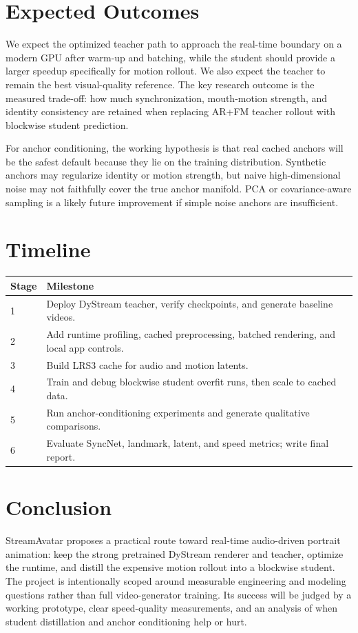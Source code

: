 \documentclass{article}
\begin{document}
\section{Expected Outcomes}

We expect the optimized teacher path to approach the real-time boundary on a modern GPU after warm-up and batching, while the student should provide a larger speedup specifically for motion rollout. We also expect the teacher to remain the best visual-quality reference. The key research outcome is the measured trade-off: how much synchronization, mouth-motion strength, and identity consistency are retained when replacing AR+FM teacher rollout with blockwise student prediction.

For anchor conditioning, the working hypothesis is that real cached anchors will be the safest default because they lie on the training distribution. Synthetic anchors may regularize identity or motion strength, but naive high-dimensional noise may not faithfully cover the true anchor manifold. PCA or covariance-aware sampling is a likely future improvement if simple noise anchors are insufficient.

\section{Timeline}

\begin{table}[H]
\centering
\begin{tabular}{@{}ll@{}}
\toprule
\textbf{Stage} & \textbf{Milestone} \\
\midrule
1 & Deploy DyStream teacher, verify checkpoints, and generate baseline videos. \\
2 & Add runtime profiling, cached preprocessing, batched rendering, and local app controls. \\
3 & Build LRS3 cache for audio and motion latents. \\
4 & Train and debug blockwise student overfit runs, then scale to cached data. \\
5 & Run anchor-conditioning experiments and generate qualitative comparisons. \\
6 & Evaluate SyncNet, landmark, latent, and speed metrics; write final report. \\
\bottomrule
\end{tabular}
\end{table}

\section{Conclusion}

StreamAvatar proposes a practical route toward real-time audio-driven portrait animation: keep the strong pretrained DyStream renderer and teacher, optimize the runtime, and distill the expensive motion rollout into a blockwise student. The project is intentionally scoped around measurable engineering and modeling questions rather than full video-generator training. Its success will be judged by a working prototype, clear speed-quality measurements, and an analysis of when student distillation and anchor conditioning help or hurt.



\end{document}
